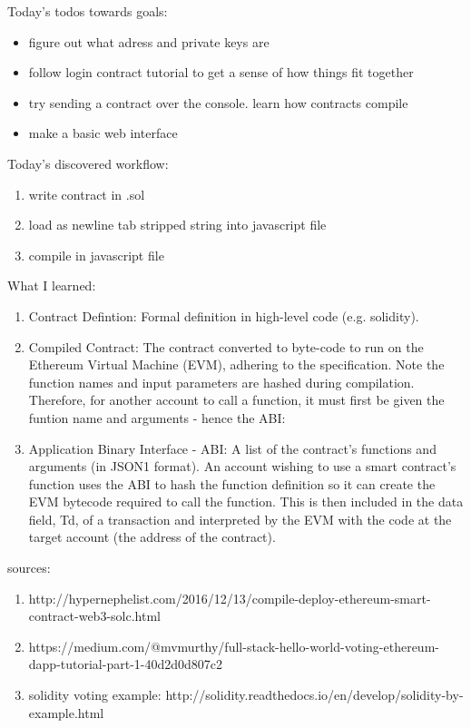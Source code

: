 Today's todos towards goals:

\begin{itemize}
	\item figure out what adress and private keys are 
	\item follow login contract tutorial to get a sense of how things fit together
	\item try sending a contract over the console. learn how contracts compile
	\item make a basic web interface
\end{itemize}

Today's discovered workflow:

\begin{enumerate}
	\item write contract in .sol
	\item load as newline tab stripped string into javascript file
	\item compile in javascript file
\end{enumerate}	

What I learned:

\begin{enumerate}
	\item Contract Defintion: Formal definition in high-level code (e.g. solidity).
	\item Compiled Contract: The contract converted to byte-code to run on the Ethereum Virtual Machine (EVM), adhering to the specification. Note the function names and input parameters are hashed during compilation. Therefore, for another account to call a function, it must first be given the funtion name and arguments - hence the ABI:
	\item Application Binary Interface - ABI: A list of the contract's functions and arguments (in JSON1 format). An account wishing to use a smart contract's function uses the ABI to hash the function definition so it can create the EVM bytecode required to call the function. This is then included in the data field, Td, of a transaction and interpreted by the EVM with the code at the target account (the address of the contract).
\end{enumerate}	


sources:

\begin{enumerate}
	\item http://hypernephelist.com/2016/12/13/compile-deploy-ethereum-smart-contract-web3-solc.html
	\item https://medium.com/@mvmurthy/full-stack-hello-world-voting-ethereum-dapp-tutorial-part-1-40d2d0d807c2
	\item solidity voting example: http://solidity.readthedocs.io/en/develop/solidity-by-example.html
\end{enumerate}


